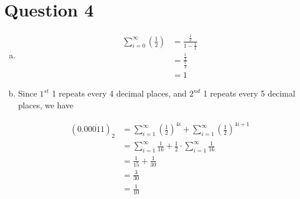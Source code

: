 \documentclass[12pt]{article}
\begin{document}
\section*{Question 4}
\begin{enumerate}[a.]
    \item
    \setcounter{equation}{0}
    \begin{align}
        \sum\limits_{i=0}^{\infty} \left(\frac{1}{2}\right) &= \frac{\frac{1}{2}}{1 - \frac{1}{2}}\\
        &= \frac{\frac{1}{2}}{\frac{1}{2}}\\
        &= 1
    \end{align}

    \item

    Since $1^{st}$ 1 repeats every 4 decimal places, and $2^{nd}$ 1 repeats every
    5 decimal places, we have

    \setcounter{equation}{0}
    \begin{align}
        (0.0\overline{0011})_2 &= \sum\limits_{i=1}^{\infty} \left(\frac{1}{2}\right)^{4i} + \sum\limits_{i=1}^{\infty} \left(\frac{1}{2}\right)^{4i + 1}\\
        &= \sum\limits_{i=1}^{\infty} \frac{1}{16} + \frac{1}{2} \cdot \sum\limits_{i=1}^{\infty} \frac{1}{16}\\
        &= \frac{1}{15} + \frac{1}{30}\\
        &= \frac{3}{30}\\
        &= \frac{1}{10}
    \end{align}
\end{enumerate}
\end{document}
